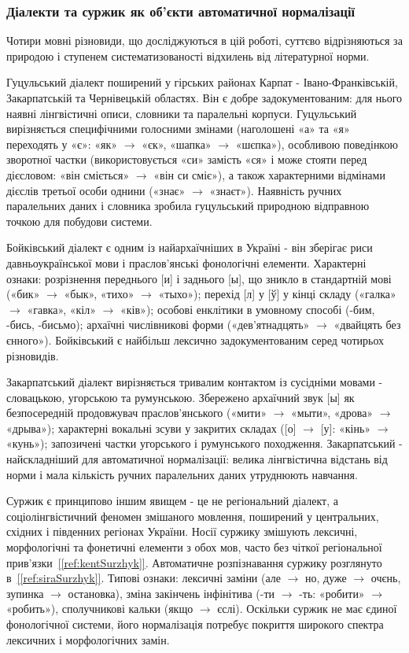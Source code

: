 \documentclass[14pt]{extarticle}
\newcommand{\citeref}[1]{\hyperref[#1]{[\ref*{#1}]}}
\begin{document}
\subsubsection{Діалекти та суржик як об'єкти автоматичної нормалізації}

Чотири мовні різновиди, що досліджуються в цій роботі, суттєво відрізняються за природою і ступенем систематизованості відхилень від літературної норми.

Гуцульський діалект поширений у гірських районах Карпат - Івано-Франківській, Закарпатській та Чернівецькій областях. Він є добре задокументованим: для нього наявні лінгвістичні описи, словники та паралельні корпуси. Гуцульський вирізняється специфічними голосними змінами (наголошені «а» та «я» переходять у «є»: «як» $\to$ «єк», «шапка» $\to$ «шєпка»), особливою поведінкою зворотної частки (використовується «си» замість «ся» і може стояти перед дієсловом: «він сміється» $\to$ «він си сміє»), а також характерними відмінами дієслів третьої особи однини («знає» $\to$ «знаєт»). Наявність ручних паралельних даних і словника зробила гуцульський природною відправною точкою для побудови системи.

Бойківський діалект є одним із найархаїчніших в Україні - він зберігає риси давньоукраїнської мови і праслов'янські фонологічні елементи. Характерні ознаки: розрізнення переднього [и] і заднього [ы], що зникло в стандартній мові («бик» $\to$ «бык», «тихо» $\to$ «тыхо»); перехід [л] у [ў] у кінці складу («галка» $\to$ «гавка», «кіл» $\to$ «ків»); особові енклітики в умовному способі (-бим, -бись, -бисьмо); архаїчні числівникові форми («дев'ятнадцять» $\to$ «двайцять без єнного»). Бойківський є найбільш лексично задокументованим серед чотирьох різновидів.

Закарпатський діалект вирізняється тривалим контактом із сусідніми мовами - словацькою, угорською та румунською. Збережено архаїчний звук [ы] як безпосередній продовжувач праслов'янського («мити» $\to$ «мыти», «дрова» $\to$ «дрыва»); характерні вокальні зсуви у закритих складах ([о] $\to$ [у]: «кінь» $\to$ «кунь»); запозичені частки угорського і румунського походження. Закарпатський - найскладніший для автоматичної нормалізації: велика лінгвістична відстань від норми і мала кількість ручних паралельних даних утруднюють навчання.

Суржик є принципово іншим явищем - це не регіональний діалект, а соціолінгвістичний феномен змішаного мовлення, поширений у центральних, східних і південних регіонах України. Носії суржику змішують лексичні, морфологічні та фонетичні елементи з обох мов, часто без чіткої регіональної прив'язки~\citeref{ref:kentSurzhyk}. Автоматичне розпізнавання суржику розглянуто в~\citeref{ref:siraSurzhyk}. Типові ознаки: лексичні заміни (але $\to$ но, дуже $\to$ очєнь, зупинка $\to$ остановка), зміна закінчень інфінітива (-ти $\to$ -ть: «робити» $\to$ «робить»), сполучникові кальки (якщо $\to$ єслі). Оскільки суржик не має єдиної фонологічної системи, його нормалізація потребує покриття широкого спектра лексичних і морфологічних замін.
\end{document}
